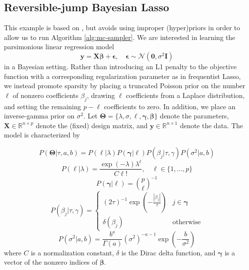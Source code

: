 \documentclass[a4paper,11pt]{article}
\begin{document}
\subsection{Reversible-jump Bayesian Lasso}
This example is based on \cite{chen_bayesian_2011}, but avoids using improper (hyper)priors in order to allow us to run Algorithm \ref{alg:mc-sampler}. We are interested in learning the parsimonious linear regression model
\begin{equation}
  \mathbf{y} = \mathbf{X}\mathbf{\beta} + \mathbf{\epsilon}, \quad \mathbf{\epsilon} \sim \mathcal{N}(\mathbf{0}, \sigma^{2} \mathbf{I})
\end{equation}
in a Bayesian setting. Rather than introducing an L1 penalty to the objective function with a corresponding regularization parameter as in frequentist Lasso, we instead promote sparsity by placing a truncated Poisson prior on the number $\ell$ of nonzero coefficients $\beta_{j}$, drawing $\ell$ coefficients from a Laplace distribution, and setting the remaining $p-\ell$ coefficients to zero. In addition, we place an inverse-gamma prior on $\sigma^{2}$. Let $\mathbf{\Theta} = \{\lambda, \sigma, \ell, \mathbf{\gamma}, \mathbf{\beta}\}$ denote the parameters, $\mathbf{X} \in \mathbb{R}^{n \times p}$ denote the (fixed) design matrix, and $\mathbf{y} \in \mathbb{R}^{n \times 1}$ denote the data. The model is characterized by

\begin{equation}
  P(\mathbf{\Theta}|\tau, a, b ) = P(\ell|\lambda) P(\mathbf{\gamma}|\ell) P(\beta_{j} | \tau, \gamma) P(\sigma^{2} | a, b)
\end{equation}
\begin{equation}
  P(\ell|\lambda) = \frac{\exp{(-\lambda)} \lambda^{\ell}}{C\ell!}, \quad \ell \in \{1,\ldots, p\}
\end{equation}
\begin{equation}
  P(\mathbf{\gamma}|\ell) = {p\choose \ell}^{-1}
\end{equation}
\begin{equation}
  P(\beta_{j} | \tau, \gamma ) = \begin{cases} (2\tau)^{-1}\exp(-\frac{|\beta_{j}|}{\tau}) & j \in \mathbf{\gamma} \\ \delta(\beta_{j}) & \text{otherwise} \end{cases}
\end{equation}
\begin{equation}
    P(\sigma^{2} | a, b) = \frac{b^{a}}{\Gamma(a)} (\sigma^{2})^{-a-1} \exp{\left(-\frac{b}{\sigma^{2}}\right)}
\end{equation}
where $C$ is a normalization constant, $\delta$ is the Dirac delta function, and $\mathbf{\gamma}$ is a vector of the nonzero indices of $\mathbf{\beta}$.
\end{document}
